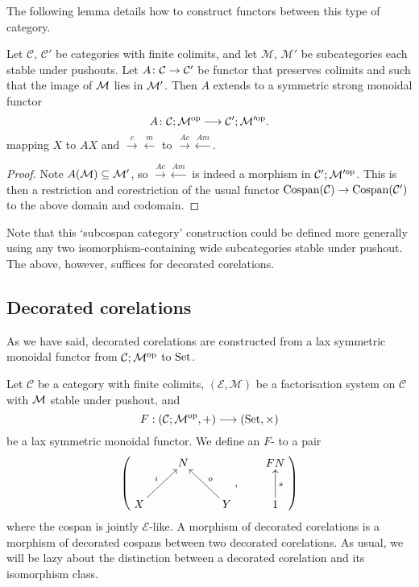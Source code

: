 The following lemma details how to construct functors between this type of
category.

\begin{lemma} \label{lem.madjointsfunctor}
  Let $\mathcal C$, $\mathcal C'$ be categories with finite colimits, and let
  $\mathcal M$, $\mathcal M'$ be subcategories each stable under pushouts. Let
  $A{\colon} \mathcal C \to \mathcal C'$ be functor that preserves colimits and such
  that the image of $\mathcal M$ lies in $\mathcal M'$. Then $A$ extends to a symmetric
  strong monoidal functor
  \[
    A{\colon} \mathcal C;\mathcal M^{\mathrm{op}} \longrightarrow \mathcal C'; \mathcal M'^{\mathrm{op}}.
  \]
  mapping $X$ to $AX$ and $\stackrel{c}\rightarrow \stackrel{m}\leftarrow$ to
  $\stackrel{Ac}\rightarrow \stackrel{Am}\leftarrow$.
\end{lemma}
\begin{proof}
  Note $A(\mathcal M) \subseteq \mathcal M'$, so $\stackrel{Ac}\rightarrow
  \stackrel{Am}\leftarrow$ is indeed a morphism in $\mathcal C';\mathcal M'^{\mathrm{op}}$. This is
  then a restriction and corestriction of the usual functor $\operatorname{{Cospan}}(\mathcal C) \to
  \operatorname{{Cospan}}(\mathcal C')$ to the above domain and codomain.
\end{proof}

Note that this `subcospan category' construction could be defined more generally
using any two isomorphism-containing wide subcategories stable under pushout.
The above, however, suffices for decorated corelations.

\subsection{Decorated corelations} \label{ssec.deccorel}

As we have said, decorated corelations are constructed from a lax symmetric
monoidal functor from $\mathcal C;\mathcal M^{\mathrm{op}}$ to $\mathrm{Set}$.

\begin{definition}
  Let $\mathcal C$ be a category with finite colimits, $(\mathcal E, \mathcal
  M)$ be a factorisation system on $\mathcal C$ with $\mathcal M$ stable under
  pushout, and 
  \[
    F: (\mathcal C;\mathcal M^{\mathrm{op}},+) \longrightarrow (\mathrm{Set}, \times)
  \]
  be a lax symmetric monoidal functor.  We define an $F$- to a pair
  \[
    \left(
    \begin{aligned}
      \xymatrix{
	& N \\  
	X \ar[ur]^{i} && Y \ar[ul]_{o}
      }
    \end{aligned}
    ,
    \qquad
    \begin{aligned}
      \xymatrix{
	FN \\
	1 \ar[u]_{s}
      }
    \end{aligned}
    \right)
  \]
  where the cospan is jointly $\mathcal E$-like. A morphism of decorated
  corelations is a morphism of decorated cospans between two decorated
  corelations.  As usual, we will be lazy about the distinction between a
  decorated corelation and its isomorphism class.
\end{definition}



